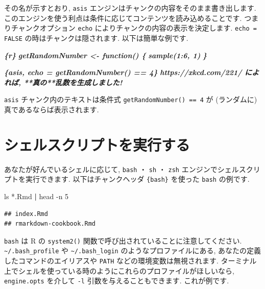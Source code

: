 \documentclass[
  11pt,
]{bxjsreport}
\newenvironment{Shaded}{\begin{snugshade}}{\end{snugshade}}
\newcommand{\FunctionTok}[1]{\textcolor[rgb]{0.00,0.00,0.00}{#1}}
\newcommand{\InformationTok}[1]{\textcolor[rgb]{0.56,0.35,0.01}{\textbf{\textit{#1}}}}
\newcommand{\KeywordTok}[1]{\textcolor[rgb]{0.13,0.29,0.53}{\textbf{#1}}}
\newcommand{\NormalTok}[1]{#1}
\begin{document}
その名が示すとおり, \texttt{asis} エンジンはチャンクの内容をそのまま書き出します. このエンジンを使う利点は条件に応じてコンテンツを読み込めることです. つまりチャンクオプション \texttt{echo} によりチャンクの内容の表示を決定します. \texttt{echo = FALSE} の時はチャンクは隠されます. 以下は簡単な例です.

\begin{Shaded}
\begin{Highlighting}[]
\InformationTok{\textasciigrave{}\textasciigrave{}\textasciigrave{}\{r\}}
\InformationTok{getRandomNumber \textless{}{-} function() \{}
\InformationTok{  sample(1:6, 1)}
\InformationTok{\}}
\InformationTok{\textasciigrave{}\textasciigrave{}\textasciigrave{}}

\InformationTok{\textasciigrave{}\textasciigrave{}\textasciigrave{}\{asis, echo = getRandomNumber() == 4\}}
\InformationTok{https://xkcd.com/221/ によれば, **真の**乱数を生成しました!}
\InformationTok{\textasciigrave{}\textasciigrave{}\textasciigrave{}}
\end{Highlighting}
\end{Shaded}

\texttt{asis} チャンク内のテキストは条件式 \texttt{getRandomNumber() == 4} が (ランダムに) 真であるならば表示されます.

\hypertarget{eng-bash}{%
\section{シェルスクリプトを実行する}\label{eng-bash}}

あなたが好んでいるシェルに応じて, \texttt{bash} ・ \texttt{sh} ・ \texttt{zsh} エンジンでシェルスクリプトを実行できます. 以下はチャンクヘッダ \texttt{\textasciigrave{}\textasciigrave{}\textasciigrave{}\{bash\}} を使った \texttt{bash} の例です.

\begin{Shaded}
\begin{Highlighting}[numbers=left,,]
\FunctionTok{ls}\NormalTok{ *.Rmd }\KeywordTok{|} \FunctionTok{head}\NormalTok{ {-}n 5}
\end{Highlighting}
\end{Shaded}

\begin{verbatim}
## index.Rmd
## rmarkdown-cookbook.Rmd
\end{verbatim}

\texttt{bash} は R の \texttt{system2()} 関数で呼び出されていることに注意してください. \texttt{\textasciitilde{}/.bash\_profile} や \texttt{\textasciitilde{}/.bash\_login} のようなプロファイルにある, あなたの定義したコマンドのエイリアスや \texttt{PATH} などの環境変数は無視されます. ターミナル上でシェルを使っている時のようにこれらのプロファイルがほしいなら, \texttt{engine.opts} を介して \texttt{-l} 引数を与えることもできます. これが例です.
\end{document}
